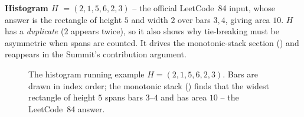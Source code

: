 \textbf{Histogram $H$} $= (2, 1, 5, 6, 2, 3)$ -- the official LeetCode~84 input, whose answer is the
rectangle of height $5$ and width $2$ over bars $3,4$, giving area $\boxed{10}$. $H$ has a
\emph{duplicate} ($2$ appears twice), so it also shows why tie-breaking must be asymmetric when spans
are counted. It drives the monotonic-stack section () and reappears in the
Summit's contribution argument.

\begin{figure}[H]
\centering
{}
\caption{The histogram running example $H=(2,1,5,6,2,3)$. Bars are drawn in index order; the
monotonic stack () finds that the widest rectangle of height $5$ spans bars
$3$--$4$ and has area $10$ -- the LeetCode~84 answer.}\label{fig:c26-hist}
\end{figure}

